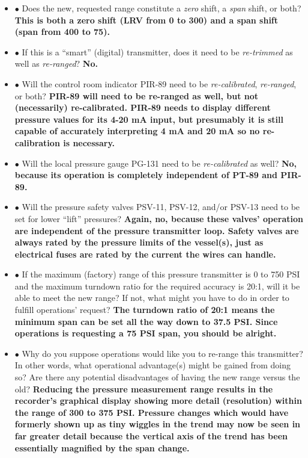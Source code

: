 \begin{itemize}
\begin{itemize}
\item{$\bullet$} Does the new, requested range constitute a {\it zero} shift, a {\it span} shift, or both?  {\bf This is both a zero shift (LRV from 0 to 300) and a span shift (span from 400 to 75).}
\vskip 10pt
\item{$\bullet$} If this is a ``smart'' (digital) transmitter, does it need to be {\it re-trimmed} as well as {\it re-ranged}?  {\bf No.}
\vskip 10pt
\item{$\bullet$} Will the control room indicator PIR-89 need to be {\it re-calibrated}, {\it re-ranged}, or both? {\bf PIR-89 will need to be re-ranged as well, but not (necessarily) re-calibrated.  PIR-89 needs to display different pressure values for its 4-20 mA input, but presumably it is still capable of accurately interpreting 4 mA and 20 mA so no re-calibration is necessary.}
\vskip 10pt
\item{$\bullet$} Will the local pressure gauge PG-131 need to be {\it re-calibrated} as well?  {\bf No, because its operation is completely independent of PT-89 and PIR-89.}
\vskip 10pt
\item{$\bullet$} Will the pressure safety valves PSV-11, PSV-12, and/or PSV-13 need to be set for lower ``lift'' pressures? {\bf Again, no, because these valves' operation are independent of the pressure transmitter loop.  Safety valves are always rated by the pressure limits of the vessel(s), just as electrical fuses are rated by the current the wires can handle.}
\vskip 10pt
\item{$\bullet$} If the maximum (factory) range of this pressure transmitter is 0 to 750 PSI and the maximum turndown ratio for the required accuracy is 20:1, will it be able to meet the new range?  If not, what might you have to do in order to fulfill operations' request? {\bf The turndown ratio of 20:1 means the minimum span can be set all the way down to 37.5 PSI.  Since operations is requesting a 75 PSI span, you should be alright.}
\vskip 10pt
\item{$\bullet$} Why do you suppose operations would like you to re-range this transmitter?  In other words, what operational advantage(s) might be gained from doing so?  Are there any potential disadvantages of having the new range versus the old? {\bf Reducing the pressure measurement range results in the recorder's graphical display showing more detail (resolution) within the range of 300 to 375 PSI.  Pressure changes which would have formerly shown up as tiny wiggles in the trend may now be seen in far greater detail because the vertical axis of the trend has been essentially magnified by the span change.}
\medskip







\end{itemize}
\end{itemize}
